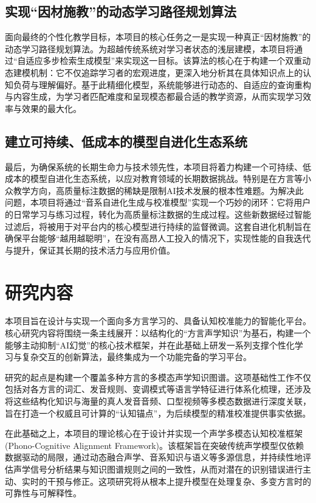 \subsection{实现“因材施教”的动态学习路径规划算法}
面向最终的个性化教学目标，本项目的核心任务之一是实现一种真正“因材施教”的动态学习路径规划算法。为超越传统系统对学习者状态的浅层建模，本项目将通过“自适应多步检索生成模型”来实现这一目标。该算法的核心在于构建一个双重动态建模机制：它不仅追踪学习者的宏观进度，更深入地分析其在具体知识点上的认知负荷与理解偏好。基于此精细化模型，系统能够进行动态的、自适应的查询重构与内容生成，为学习者匹配难度和呈现模态都最合适的教学资源，从而实现学习效率与效果的最大化。

\subsection{建立可持续、低成本的模型自进化生态系统}
最后，为确保系统的长期生命力与技术领先性，本项目将着力构建一个可持续、低成本的模型自进化生态系统，以应对教育领域的长期数据挑战。特别是在方言等小众教学方向，高质量标注数据的稀缺是限制AI技术发展的根本性难题。为解决此问题，本项目将通过“音系自进化生成与校准模型”实现一个巧妙的闭环：它将用户的日常学习与练习过程，转化为高质量标注数据的生成过程。这些新数据经过智能过滤后，将被用于对平台内的核心模型进行持续的监督微调。这套自进化机制旨在确保平台能够“越用越聪明”，在没有高昂人工投入的情况下，实现性能的自我迭代与提升，保证其长期的技术活力与应用价值。

\section{研究内容}
本项目旨在设计与实现一个面向多方言学习的、具备认知校准能力的智能化平台。核心研究内容将围绕一条主线展开：以结构化的“方言声学知识”为基石，构建一个能够主动抑制“AI幻觉”的核心技术框架，并在此基础上研发一系列支撑个性化学习与复杂交互的创新算法，最终集成为一个功能完备的学习平台。

研究的起点是构建一个覆盖多种方言的多模态声学知识图谱。这项基础性工作不仅包括对各方言的词汇、发音规则、变调模式等语言学特征进行体系化梳理，还涉及将这些结构化知识与海量的真人发音音频、口型视频等多模态数据进行深度关联，旨在打造一个权威且可计算的“认知锚点”，为后续模型的精准校准提供事实依据。

在此基础之上，本项目的理论核心在于设计并实现一个声学多模态认知校准框架 (Phono-Cognitive Alignment Framework)。该框架旨在突破传统声学模型仅依赖数据驱动的局限，通过动态融合声学、音系知识与语义等多源信息，并持续性地评估声学信号分析结果与知识图谱规则之间的一致性，从而对潜在的识别错误进行主动、实时的干预与修正。这项研究将从根本上提升模型在处理复杂、多变方言时的可靠性与可解释性。

